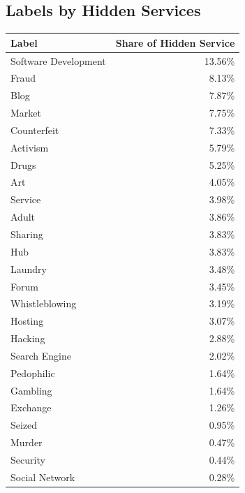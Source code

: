 \documentclass[USenglish,oneside,twocolumn]{article}
\begin{document}
\subsection{Labels by Hidden Services}
\label{appendix:labelsByHosts}
\begin{center}
    \begin{supertabular}[H]{p{4cm} | r{3.5cm}}
    \textbf{Label}  & \textbf{Share of Hidden Service}\\
    \hline
    \hline
    Software Development	&	13.56\%\\
	\hline
	Fraud		&	8.13\%\\
	\hline
	Blog		&	7.87\%\\
	\hline
	Market		&	7.75\%\\
	\hline
	Counterfeit	&	7.33\%\\
	\hline
	Activism	&	5.79\%\\
	\hline
	Drugs		&	5.25\%\\
	\hline
	Art			&	4.05\%\\
	\hline
	Service		&	3.98\%\\
	\hline
	Adult		&	3.86\%\\
	\hline
	Sharing		&	3.83\%\\
	\hline
	Hub		&	3.83\%\\
	\hline
	Laundry		&	3.48\%\\
	\hline
	Forum		&	3.45\%\\
	\hline
	Whistleblowing			&	3.19\%\\
	\hline
	Hosting		&	3.07\%\\
	\hline
	Hacking		&	2.88\%\\
	\hline
	Search Engine			&	2.02\%\\
	\hline
	Pedophilic	&	1.64\%\\
	\hline
	Gambling	&	1.64\%\\
	\hline
	Exchange	&	1.26\%\\
	\hline
	Seized		&	0.95\%\\
	\hline
	Murder		&	0.47\%\\
	\hline
	Security	&	0.44\%\\
	\hline
	Social Network			&	0.28\%\\
    \end{supertabular}
\end{center}
\end{document}
